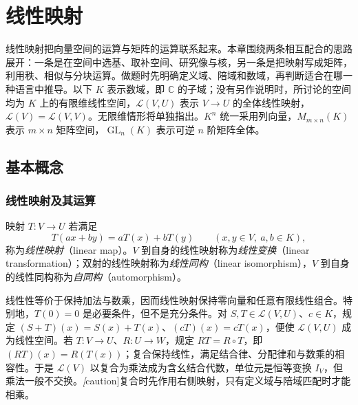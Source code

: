 \setcounter{chapter}{3} %
\chapter{线性映射}
\label{chap:xie-ex-linear-maps}

线性映射把向量空间的运算与矩阵的运算联系起来。本章围绕两条相互配合的思路展开：一条是在空间中选基、取补空间、研究像与核，另一条是把映射写成矩阵，利用秩、相似与分块运算。做题时先明确定义域、陪域和数域，再判断适合在哪一种语言中推导。以下 $K$ 表示数域，即 $\mathbb C$ 的子域；没有另作说明时，所讨论的空间均为 $K$ 上的有限维线性空间，$\mathcal L(V,U)$ 表示 $V\to U$ 的全体线性映射，$\mathcal L(V)=\mathcal L(V,V)$。无限维情形将单独指出。$K^n$ 统一采用列向量，$M_{m\times n}(K)$ 表示 $m\times n$ 矩阵空间，$\operatorname{GL}_n(K)$ 表示可逆 $n$ 阶矩阵全体。

\section{基本概念}
\label{sec:xie-ex-linear-basics}

\subsection{线性映射及其运算}

\begin{definition}
\label{def:xie-ex-linear-map}
映射 $T:V\to U$ 若满足
\[
    T(ax+by)=aT(x)+bT(y)
    \qquad(x,y\in V,\ a,b\in K),
\]
称为\emph{线性映射}（linear map）。$V$ 到自身的线性映射称为\emph{线性变换}（linear transformation）；双射的线性映射称为\emph{线性同构}（linear isomorphism），$V$ 到自身的线性同构称为\emph{自同构}（automorphism）。
\end{definition}

线性性等价于保持加法与数乘，因而线性映射保持零向量和任意有限线性组合。特别地，$T(0)=0$ 是必要条件，但不是充分条件。对 $S,T\in\mathcal L(V,U)$、$c\in K$，规定 $(S+T)(x)=S(x)+T(x)$、$(cT)(x)=cT(x)$，便使 $\mathcal L(V,U)$ 成为线性空间。若 $T:V\to U$、$R:U\to W$，规定 $RT=R\circ T$，即 $(RT)(x)=R(T(x))$；复合保持线性，满足结合律、分配律和与数乘的相容性。于是 $\mathcal L(V)$ 以复合为乘法成为含幺结合代数，单位元是恒等变换 $I_V$，但乘法一般不交换。\emph[caution]{复合时先作用右侧映射，只有定义域与陪域匹配时才能相乘。}

